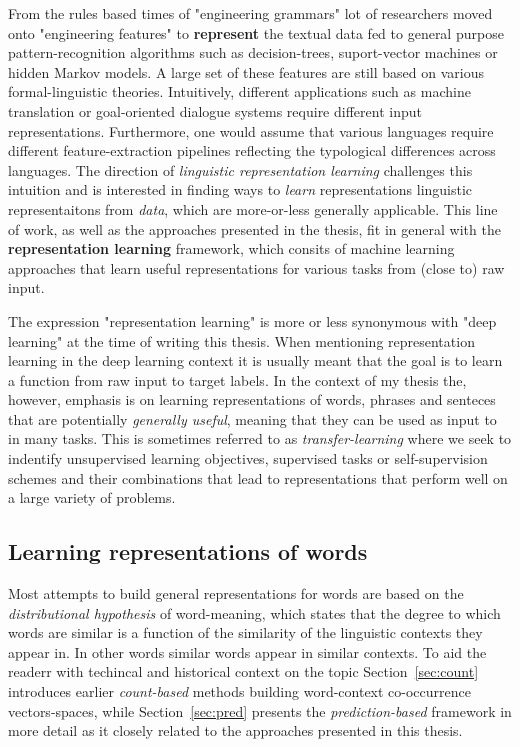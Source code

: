 From the rules based times of "engineering grammars" lot of researchers moved onto "engineering features"
to \textbf{represent} the textual data fed to general purpose pattern-recognition algorithms such as
decision-trees, suport-vector machines or hidden Markov models. A large set of these features are still based on
various formal-linguistic theories.
Intuitively, different applications such as machine translation or goal-oriented dialogue systems 
require different input representations. Furthermore, one would assume that various languages require 
different feature-extraction pipelines reflecting the typological differences across languages. 
The direction of \emph{linguistic representation learning} challenges this intuition and is interested in finding
ways to \emph{learn} representations linguistic representaitons from \emph{data}, which are more-or-less
generally applicable. This line of work, as well as the approaches presented in the thesis,
fit in general with the \textbf{representation learning} 
framework, which consits of machine learning approaches that learn useful representations 
for various tasks from (close to) raw input.

The expression "representation learning" is more or less synonymous with "deep learning" at the time
of writing this thesis. When mentioning representation learning in the deep learning context
it is usually meant that the goal is to learn a function from raw input to target labels. In the 
context of my thesis the, however, emphasis is on learning representations of words, phrases and 
senteces that are potentially \emph{generally useful}, meaning 
that they can be used as input to in many tasks. This is sometimes referred to as 
\emph{transfer-learning} where we seek to indentify unsupervised learning objectives, 
supervised tasks or self-supervision schemes and their combinations that lead to representations that
perform well on a large variety of problems. 

\subsection{Learning representations of words}


Most attempts to build  general representations for words are based on the 
\emph{distributional hypothesis} of word-meaning, which states that the degree to which words are similar 
is a function of the similarity of the linguistic contexts they appear in. In other words similar 
words appear in similar contexts. To aid the readerr with techincal and historical context 
on the topic Section~\ref{sec:count} introduces earlier \emph{count-based} methods building word-context co-occurrence vectors-spaces, 
while  Section~\ref{sec:pred} presents the  \emph{prediction-based} framework in more detail as it closely related
to the approaches presented in this thesis.

